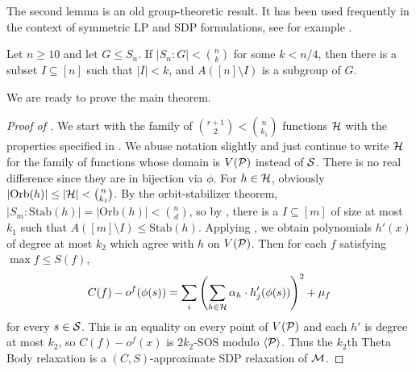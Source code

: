 The second lemma is an old group-theoretic result. It has been used frequently in the context of symmetric LP and SDP formulations, see for example \cite{}. 
\begin{lemma}\label{lem:dixandmort}
Let $n \geq 10$ and let $G \leq S_n$. If $|S_n: G| < \binom{n}{k}$ for some $k < n/4$, then there is a subset $I \subseteq [n]$ such that $|I| < k$, and $A([n] \setminus I)$ is a subgroup of $G$.
\end{lemma}
We are ready to prove the main theorem.
\begin{proof}[Proof of ]
We start with the family of $\binom{r+1}{2} < \binom{n}{k_1}$ functions $\mathcal H$ with the properties specified in . We abuse notation slightly and just continue to write $\mathcal H$ for the family of functions whose domain is $V(\mathcal P)$ instead of $\mathcal S$. There is no real difference since they are in bijection via $\phi$. For $h \in \mathcal H$, obviously $|\text{Orb}(h)| \leq |\mathcal H| < \binom{n}{k_1}$. By the orbit-stabilizer theorem, $|S_m : \text{Stab}(h)| = |\text{Orb}(h)| < \binom{n}{d}$, so by , there is a $I \subseteq [m]$ of size at most $k_1$ such that $A([m] \setminus I) \leq \text{Stab}(h)$. Applying , we obtain polynomials $h'(x)$ of degree at most $k_2$ which agree with $h$ on $V(\mathcal P)$. Then for each $f$ satisfying $\max f \leq S(f)$,
\[C(f) - o^f(\phi(s)) = \sum_i \left(\sum_{h \in \mathcal H} \alpha_h \cdot h'_j(\phi(s))\right)^2 + \mu_f\]
for every $s \in \mathcal S$. This is an equality on every point of $V(\mathcal P)$ and each $h'$ is degree at most $k_2$, so $C(f) - o^f(x)$ is $2k_2$-SOS modulo $\langle \mathcal P \rangle$. Thus the $k_2$th Theta Body relaxation is a $(C,S)$-approximate SDP relaxation of $\mathcal M$. 
\end{proof}

